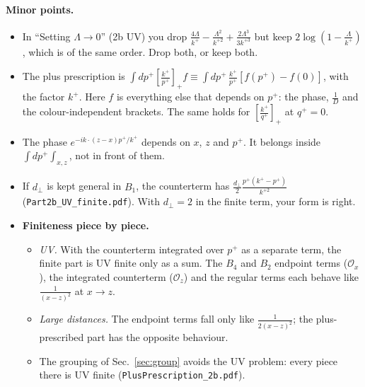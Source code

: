 \documentclass[10pt]{article}
\numberwithin{equation}{section}
\newcommand{\Ox}{\mathcal O_x}
\newcommand{\Oz}{\mathcal O_z}
\begin{document}
\paragraph{Minor points.}
\begin{itemize}
\item[M1.] In ``Setting $\Lambda\to0$'' (2b UV) you drop $\frac{4\Lambda}{k^+}-\frac{\Lambda^2}{k^{+2}}+\frac{2\Lambda^3}{3k^{+3}}$ but keep $2\log(1-\frac{\Lambda}{k^+})$, which is of the same order. Drop both, or keep both.
\item[M2.] The plus prescription is $\int dp^+[\frac{k^+}{p^+}]_+f\equiv\int dp^+\,\frac{k^+}{p^+}[f(p^+)-f(0)]$, with the factor $k^+$. Here $f$ is everything else that depends on $p^+$: the phase, $\frac1D$ and the colour-independent brackets. The same holds for $[\frac{k^+}{q^+}]_+$ at $q^+=0$.
\item[M3.] The phase $e^{-ik\cdot(z-x)p^+/k^+}$ depends on $x$, $z$ and $p^+$. It belongs inside $\int dp^+\int_{x,z}$, not in front of them.
\item[M4.] If $d_\perp$ is kept general in $B_1$, the counterterm has $\frac{d_\perp}{2}\frac{p^+(k^+-p^+)}{k^{+2}}$ (\texttt{Part2b\_UV\_finite.pdf}). With $d_\perp=2$ in the finite term, your form is right.
\item[M5.] \textbf{Finiteness piece by piece.}
\begin{itemize}
\item \emph{UV.} With the counterterm integrated over $p^+$ as a separate term, the finite part is UV finite only as a sum. The $B_4$ and $B_2$ endpoint terms ($\Ox$), the integrated counterterm ($\Oz$) and the regular terms each behave like $\frac{1}{(x-z)^2}$ at $x\to z$.
\item \emph{Large distances.} The endpoint terms fall only like $\frac{1}{2(x-z)^2}$; the plus-prescribed part has the opposite behaviour.
\item The grouping of Sec.~\ref{sec:group} avoids the UV problem: every piece there is UV finite (\texttt{PlusPrescription\_2b.pdf}).
\end{itemize}
\end{itemize}

\end{document}
